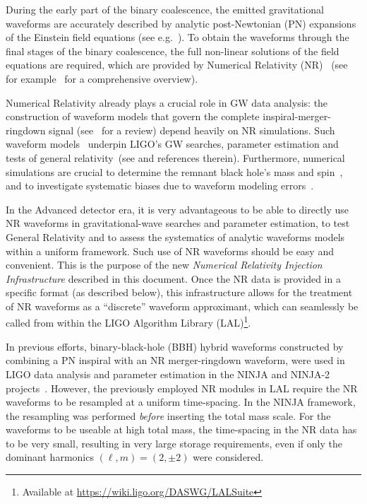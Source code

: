 \documentclass[11pt,tightenlines,article,amssymb,amsmath,amsfonts,superscriptaddress,nofootinbib]{revtex4}
\begin{document}
During the early part of the binary coalescence, the emitted gravitational waveforms are accurately described by
analytic post-Newtonian (PN) expansions of the Einstein field equations (see e.g.~\cite{lrr-2014-2}). 
To obtain the waveforms through the final stages of the binary coalescence, the full non-linear solutions
of the field equations are required, which are provided by Numerical Relativity (NR)~\cite{Pretorius:2005gq, Baker:2005vv, Campanelli:2005dd} (see for example~\cite{Centrella:2010mx} for a comprehensive overview).

Numerical Relativity already plays a crucial role in GW data analysis: the construction of waveform models that govern the complete inspiral-merger-ringdown signal (see~\cite{Ohme:2011rm} for a review) depend heavily on NR simulations. Such waveform models~\cite{Hannam:2013oca, Pan:2013rra, Taracchini:2013rva, Khan:2015jqa} underpin LIGO's GW searches, parameter estimation and tests of general relativity~(see \cite{Abbott:2016blz} and references therein). Furthermore, numerical simulations are crucial to determine the remnant black hole's mass and spin~\cite{Healy:2014yta}, and to investigate systematic biases due to waveform modeling errors~\cite{Abbott:2016wiq}.

In the Advanced detector era, it is very advantageous to be able to directly use NR waveforms in gravitational-wave searches and parameter estimation, to test General Relativity and to assess the systematics of analytic waveforms models within a uniform framework. Such use of NR waveforms should be easy and convenient.
This is the purpose of the new \emph{Numerical Relativity Injection Infrastructure} described in this document. Once the NR data is provided in a specific format (as described below), this infrastructure allows for the treatment of
NR waveforms as a ``discrete'' waveform approximant, which can seamlessly be called from within the LIGO Algorithm Library (LAL)\footnote{Available at \url{https://wiki.ligo.org/DASWG/LALSuite}}.

In previous efforts, binary-black-hole (BBH) hybrid waveforms constructed by combining a PN inspiral with an NR merger-ringdown waveform, were used in LIGO data analysis and parameter estimation in the NINJA and NINJA-2 projects~\cite{Aylott:2009ya, Aasi:2014tra}.  
However, the previously employed NR modules in LAL
require the NR waveforms to be resampled at a uniform time-spacing. In the NINJA framework, the resampling was performed \emph{before} inserting the total mass scale. For the waveforms to be
useable at high total mass, the time-spacing in the NR data has to be very small, resulting in very large storage requirements, even if only the dominant harmonics $(\ell,m)=(2,\pm 2)$ were considered.
\end{document}
